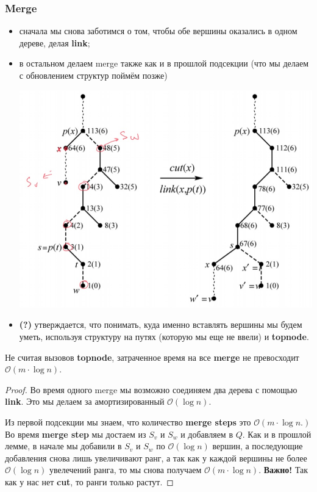 \subsubsection{Merge}
\begin{itemize}
    \item сначала мы снова заботимся о том, чтобы обе вершины оказались в одном дереве, делая \textbf{link};
    \item в остальном делаем merge также как и в прошлой подсекции (что мы делаем с обновлением структур поймём позже)
    \begin{center}
        \includegraphics[scale = 0.6]{img/new_merge.jpg}
    \end{center}
    \item \textbf{(?)} утверждается, что понимать, куда именно вставлять вершины мы будем уметь, используя структуру на путях (которую мы еще не ввели) и \textbf{topnode}.
    
\end{itemize}
\begin{lemma}
Не считая вызовов \textbf{topnode}, затраченное время на все \textbf{merge} не превосходит $\mathcal{O}(m\cdot\log{n}).$
\end{lemma}
\begin{proof}
Во время одного merge мы возможно соединяем два дерева с помощью \textbf{link}. Это мы делаем за амортизированный $\mathcal{O}(\log{n}).$ 

Из первой подсекции мы знаем, что количество \textbf{merge steps} это $\mathcal{O}(m\cdot\log{n}.)$ Во время \textbf{merge step} мы достаем из $S_v$ и $S_w$ и добавляем в $Q.$ Как и в прошлой лемме, в начале мы добавили в $S_v$ и $S_w$ по $\mathcal{O}(\log{n})$ вершин, а последующие добавления снова лишь увеличивают ранг, а так как у каждой вершины не более $\mathcal{O}(\log{n})$ увелечений ранга, то мы снова получаем $\mathcal{O}(m\cdot\log{n}).$ \textbf{Важно!} Так как у нас нет \textbf{cut}, то ранги только растут.

\end{proof}
